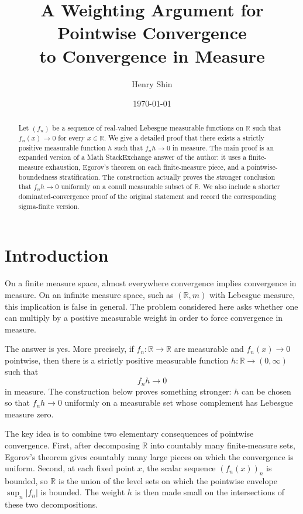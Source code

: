 \documentclass[11pt]{article}
\title{A Weighting Argument for Pointwise Convergence\\to Convergence in Measure}
\author{Henry Shin}
\date{\today}
\newcommand{\R}{\mathbb{R}}
\theoremstyle{plain}
\theoremstyle{definition}
\theoremstyle{remark}
\begin{document}
\maketitle

\begin{abstract}
Let $(f_n)$ be a sequence of real-valued Lebesgue measurable functions on
$\R$ such that $f_n(x)\to 0$ for every $x\in\R$.  We give a detailed proof
that there exists a strictly positive measurable function $h$ such that
$f_nh\to 0$ in measure.  The main proof is an expanded version of a
Math StackExchange answer of the author: it uses a finite-measure exhaustion,
Egorov's theorem on each finite-measure piece, and a pointwise-boundedness
stratification.  The construction actually proves the stronger conclusion
that $f_nh\to 0$ uniformly on a conull measurable subset of $\R$.
We also include a shorter dominated-convergence proof of the original
statement and record the corresponding sigma-finite version.
\end{abstract}

\section{Introduction}

On a finite measure space, almost everywhere convergence implies convergence
in measure.  On an infinite measure space, such as $(\R,m)$ with Lebesgue
measure, this implication is false in general.  The problem considered here
asks whether one can multiply by a positive measurable weight in order to
force convergence in measure.

The answer is yes.  More precisely, if $f_n:\R\to\R$ are measurable and
$f_n(x)\to 0$ pointwise, then there is a strictly positive measurable
function $h:\R\to(0,\infty)$ such that
\[
        f_nh\longrightarrow 0
\]
in measure.  The construction below proves something stronger: $h$ can be
chosen so that $f_nh\to 0$ uniformly on a measurable set whose complement has
Lebesgue measure zero.

The key idea is to combine two elementary consequences of pointwise
convergence.  First, after decomposing $\R$ into countably many finite-measure
sets, Egorov's theorem gives countably many large pieces on which the
convergence is uniform.  Second, at each fixed point $x$, the scalar sequence
$(f_n(x))_n$ is bounded, so $\R$ is the union of the level sets on which the
pointwise envelope $\sup_n |f_n|$ is bounded.  The weight $h$ is then made
small on the intersections of these two decompositions.
\end{document}
